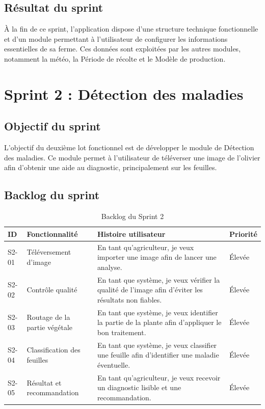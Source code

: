 \documentclass[12pt,a4paper]{report}
\begin{document}
\subsection{Résultat du sprint}

À la fin de ce sprint, l'application dispose d'une structure technique fonctionnelle et d'un module permettant à l'utilisateur de configurer les informations essentielles de sa ferme. Ces données sont exploitées par les autres modules, notamment la météo, la Période de récolte et le Modèle de production.

\section{Sprint 2 : Détection des maladies}

\subsection{Objectif du sprint}

L'objectif du deuxième lot fonctionnel est de développer le module de Détection des maladies. Ce module permet à l'utilisateur de téléverser une image de l'olivier afin d'obtenir une aide au diagnostic, principalement sur les feuilles.

\subsection{Backlog du sprint}

\begin{table}[H]
\centering
\caption{Backlog du Sprint 2}
\label{tab:backlog-sprint2}
\begin{tabular}{|p{1.4cm}|p{4.5cm}|p{6.6cm}|p{2cm}|}
\hline
\textbf{ID} & \textbf{Fonctionnalité} & \textbf{Histoire utilisateur} & \textbf{Priorité} \\
\hline
S2-01 & Téléversement d'image & En tant qu'agriculteur, je veux importer une image afin de lancer une analyse. & Élevée \\
\hline
S2-02 & Contrôle qualité & En tant que système, je veux vérifier la qualité de l'image afin d'éviter les résultats non fiables. & Élevée \\
\hline
S2-03 & Routage de la partie végétale & En tant que système, je veux identifier la partie de la plante afin d'appliquer le bon traitement. & Élevée \\
\hline
S2-04 & Classification des feuilles & En tant que système, je veux classifier une feuille afin d'identifier une maladie éventuelle. & Élevée \\
\hline
S2-05 & Résultat et recommandation & En tant qu'agriculteur, je veux recevoir un diagnostic lisible et une recommandation. & Élevée \\
\hline
\end{tabular}
\end{table}
\end{document}
